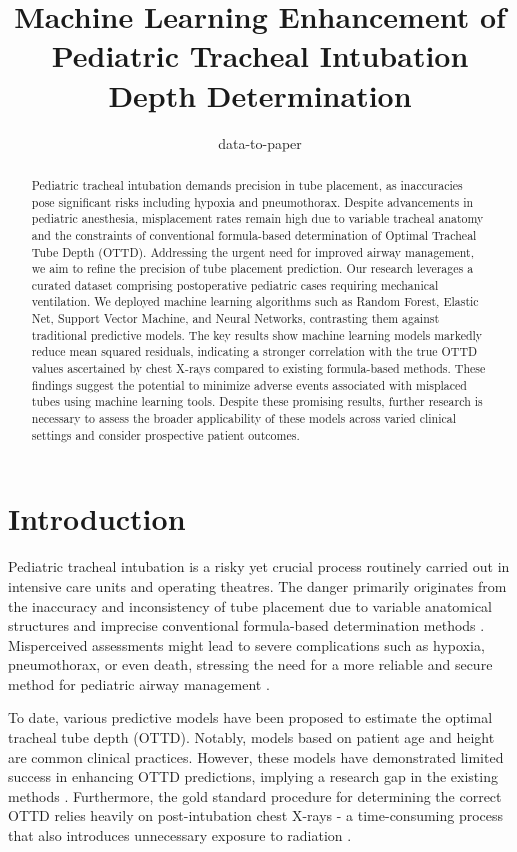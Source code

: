 \documentclass[11pt]{article}
\title{Machine Learning Enhancement of Pediatric Tracheal Intubation Depth Determination}
\author{data-to-paper}
\begin{document}
\maketitle
\begin{abstract}
Pediatric tracheal intubation demands precision in tube placement, as inaccuracies pose significant risks including hypoxia and pneumothorax. Despite advancements in pediatric anesthesia, misplacement rates remain high due to variable tracheal anatomy and the constraints of conventional formula-based determination of Optimal Tracheal Tube Depth (OTTD). Addressing the urgent need for improved airway management, we aim to refine the precision of tube placement prediction. Our research leverages a curated dataset comprising postoperative pediatric cases requiring mechanical ventilation. We deployed machine learning algorithms such as Random Forest, Elastic Net, Support Vector Machine, and Neural Networks, contrasting them against traditional predictive models. The key results show machine learning models markedly reduce mean squared residuals, indicating a stronger correlation with the true OTTD values ascertained by chest X-rays compared to existing formula-based methods. These findings suggest the potential to minimize adverse events associated with misplaced tubes using machine learning tools. Despite these promising results, further research is necessary to assess the broader applicability of these models across varied clinical settings and consider prospective patient outcomes.
\end{abstract}
\section*{Introduction}

Pediatric tracheal intubation is a risky yet crucial process routinely carried out in intensive care units and operating theatres. The danger primarily originates from the inaccuracy and inconsistency of tube placement due to variable anatomical structures and imprecise conventional formula-based determination methods \cite{Matava2020PediatricAM, Kollef1994EndotrachealTM, Cook2005ThePL}. Misperceived assessments might lead to severe complications such as hypoxia, pneumothorax, or even death, stressing the need for a more reliable and secure method for pediatric airway management \cite{Kollef1994EndotrachealTM}. 

To date, various predictive models have been proposed to estimate the optimal tracheal tube depth (OTTD). Notably, models based on patient age and height are common clinical practices. However, these models have demonstrated limited success in enhancing OTTD predictions, implying a research gap in the existing methods \cite{Yoo2021DeepLF, Tareerath2021AccuracyOA}. Furthermore, the gold standard procedure for determining the correct OTTD relies heavily on post-intubation chest X-rays - a time-consuming process that also introduces unnecessary exposure to radiation \cite{Matava2020PediatricAM}. 
\end{document}
